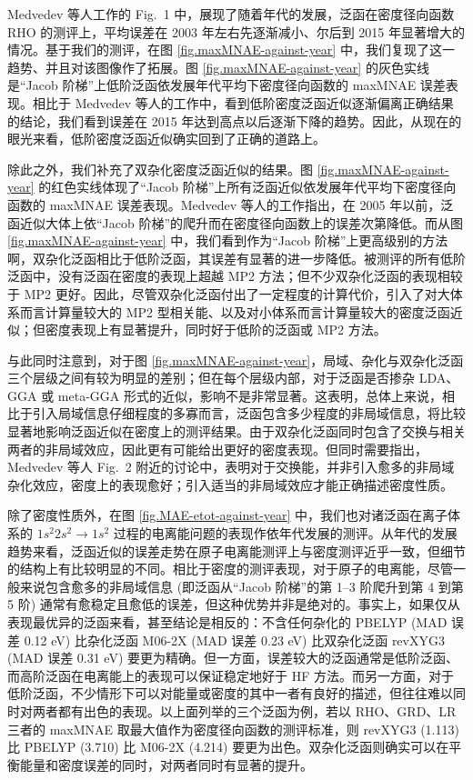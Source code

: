 Medvedev 等人工作的 Fig.\ 1 中，展现了随着年代的发展，泛函在密度径向函数 RHO 的测评上，平均误差在 2003 年左右先逐渐减小、尔后到 2015 年显著增大的情况。基于我们的测评，在图 \ref{fig.maxMNAE-against-year} 中，我们复现了这一趋势、并且对该图像作了拓展。图 \ref{fig.maxMNAE-against-year} 的灰色实线是“Jacob 阶梯”上低阶泛函依发展年代平均下密度径向函数的 maxMNAE 误差表现。相比于 Medvedev 等人的工作中，看到低阶密度泛函近似逐渐偏离正确结果的结论，我们看到误差在 2015 年达到高点以后逐渐下降的趋势。因此，从现在的眼光来看，低阶密度泛函近似确实回到了正确的道路上。

除此之外，我们补充了双杂化密度泛函近似的结果。图 \ref{fig.maxMNAE-against-year} 的红色实线体现了“Jacob 阶梯”上所有泛函近似依发展年代平均下密度径向函数的 maxMNAE 误差表现。Medvedev 等人的工作指出，在 2005 年以前，泛函近似大体上依“Jacob 阶梯”的爬升而在密度径向函数上的误差次第降低。而从图 \ref{fig.maxMNAE-against-year} 中，我们看到作为“Jacob 阶梯”上更高级别的方法啊，双杂化泛函相比于低阶泛函，其误差有显著的进一步降低。被测评的所有低阶泛函中，没有泛函在密度的表现上超越 MP2 方法；但不少双杂化泛函的表现相较于 MP2 更好。因此，尽管双杂化泛函付出了一定程度的计算代价，引入了对大体系而言计算量较大的 MP2 型相关能、以及对小体系而言计算量较大的密度泛函近似；但密度表现上有显著提升，同时好于低阶的泛函或 MP2 方法。

与此同时注意到，对于图 \ref{fig.maxMNAE-against-year}，局域、杂化与双杂化泛函三个层级之间有较为明显的差别；但在每个层级内部，对于泛函是否掺杂 LDA、GGA 或 meta-GGA 形式的近似，影响不是非常显著。这表明，总体上来说，相比于引入局域信息仔细程度的多寡而言，泛函包含多少程度的非局域信息，将比较显著地影响泛函近似在密度上的测评结果。由于双杂化泛函同时包含了交换与相关两者的非局域效应，因此更有可能给出更好的密度表现。但同时需要指出，Medvedev 等人 Fig.\ 2 附近的讨论中，表明对于交换能，并非引入愈多的非局域杂化效应，密度上的表现愈好；引入适当的非局域效应才能正确描述密度性质。

除了密度性质外，在图 \ref{fig.MAE-etot-against-year} 中，我们也对诸泛函在离子体系的 $1s^2 2s^2 \rightarrow 1s^2$ 过程的电离能问题的表现作依年代发展的测评。从年代的发展趋势来看，泛函近似的误差走势在原子电离能测评上与密度测评近乎一致，但细节的结构上有比较明显的不同。相比于密度的测评表现，对于原子的电离能，尽管一般来说包含愈多的非局域信息 (即泛函从“Jacob 阶梯”的第 1--3 阶爬升到第 4 到第 5 阶) 通常有愈稳定且愈低的误差，但这种优势并非是绝对的。事实上，如果仅从表现最优异的泛函来看，甚至结论是相反的：不含任何杂化的 PBELYP (MAD 误差 0.12 eV) 比杂化泛函 M06-2X (MAD 误差 0.23 eV) 比双杂化泛函 revXYG3 (MAD 误差 0.31 eV) 要更为精确。但一方面，误差较大的泛函通常是低阶泛函、而高阶泛函在电离能上的表现可以保证稳定地好于 HF 方法。而另一方面，对于低阶泛函，不少情形下可以对能量或密度的其中一者有良好的描述，但往往难以同时对两者都有出色的表现。以上面列举的三个泛函为例，若以 RHO、GRD、LR 三者的 maxMNAE 取最大值作为密度径向函数的测评标准，则 revXYG3 (1.113) 比 PBELYP (3.710) 比 M06-2X (4.214) 要更为出色。双杂化泛函则确实可以在平衡能量和密度误差的同时，对两者同时有显著的提升。


